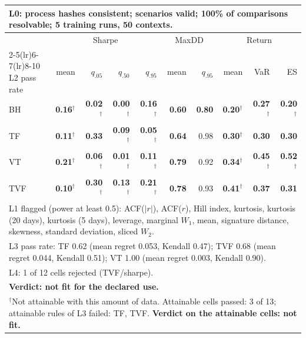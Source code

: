 \begin{tabular}{lrrrrrrrrr}
\toprule
\multicolumn{10}{p{13.5cm}}{L0: process hashes consistent; scenarios valid; 100\% of comparisons resolvable; 5 training runs, 50 contexts.} \\
\midrule
 & \multicolumn{4}{c}{Sharpe} & \multicolumn{2}{c}{MaxDD} & \multicolumn{3}{c}{Return} \\
\cmidrule(lr){2-5}\cmidrule(lr){6-7}\cmidrule(lr){8-10}
L2 pass rate & mean & $q_{.05}$ & $q_{.50}$ & $q_{.95}$ & mean & $q_{.95}$ & mean & VaR & ES \\
\midrule
BH & \textbf{0.16}$^{\dagger}$ & \textbf{0.02}$^{\dagger}$ & \textbf{0.00}$^{\dagger}$ & \textbf{0.16}$^{\dagger}$ & \textbf{0.60} & \textbf{0.80} & \textbf{0.20}$^{\dagger}$ & \textbf{0.27}$^{\dagger}$ & \textbf{0.20}$^{\dagger}$ \\
TF & \textbf{0.11}$^{\dagger}$ & \textbf{0.33} & \textbf{0.09}$^{\dagger}$ & \textbf{0.05}$^{\dagger}$ & \textbf{0.64} & 0.98 & \textbf{0.30}$^{\dagger}$ & \textbf{0.30} & \textbf{0.30} \\
VT & \textbf{0.21}$^{\dagger}$ & \textbf{0.06}$^{\dagger}$ & \textbf{0.01}$^{\dagger}$ & \textbf{0.11}$^{\dagger}$ & \textbf{0.79} & 0.92 & \textbf{0.34}$^{\dagger}$ & \textbf{0.45}$^{\dagger}$ & \textbf{0.52}$^{\dagger}$ \\
TVF & \textbf{0.10}$^{\dagger}$ & \textbf{0.30}$^{\dagger}$ & \textbf{0.13}$^{\dagger}$ & \textbf{0.21}$^{\dagger}$ & \textbf{0.78} & 0.93 & \textbf{0.41}$^{\dagger}$ & \textbf{0.37} & \textbf{0.31} \\
\midrule
\multicolumn{10}{p{13.5cm}}{L1 flagged (power at least 0.5): ACF($|r|$), ACF($r$), Hill index, kurtosis, kurtosis (20 days), kurtosis (5 days), leverage, marginal $W_1$, mean, signature distance, skewness, standard deviation, sliced $W_2$.} \\
\multicolumn{10}{p{13.5cm}}{L3 pass rate: TF 0.62 (mean regret 0.053, Kendall 0.47); TVF 0.68 (mean regret 0.044, Kendall 0.51); VT 1.00 (mean regret 0.003, Kendall 0.90).} \\
\multicolumn{10}{p{13.5cm}}{L4: 1 of 12 cells rejected (TVF/sharpe).} \\
\multicolumn{10}{p{13.5cm}}{\textbf{Verdict: not fit for the declared use.}} \\
\multicolumn{10}{p{13.5cm}}{$^{\dagger}$Not attainable with this amount of data. Attainable cells passed: 3 of 13; attainable rules of L3 failed: TF, TVF. \textbf{Verdict on the attainable cells: not fit.}} \\
\bottomrule
\end{tabular}
